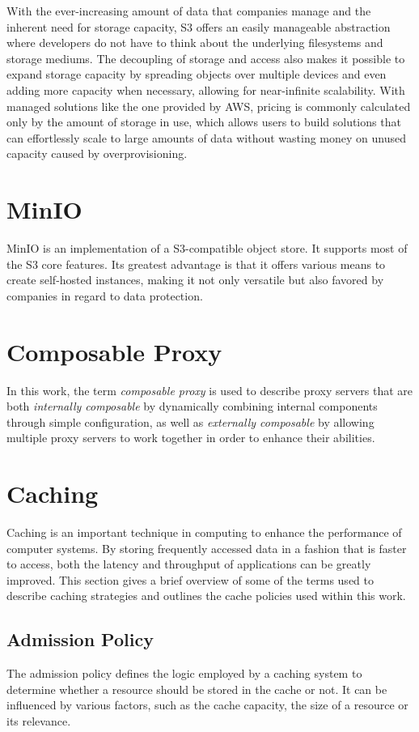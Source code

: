 With the ever-increasing amount of data that companies manage and the inherent need for storage capacity, S3 offers an easily manageable abstraction where developers do not have to think about the underlying filesystems and storage mediums. The decoupling of storage and access also makes it possible to expand storage capacity by spreading objects over multiple devices and even adding more capacity when necessary, allowing for near-infinite scalability. With managed solutions like the one provided by AWS, pricing is commonly calculated only by the amount of storage in use, which allows users to build solutions that can effortlessly scale to large amounts of data without wasting money on unused capacity caused by overprovisioning.

\section{MinIO}
MinIO is an implementation of a S3-compatible object store. It supports most of the S3 core features. Its greatest advantage is that it offers various means to create self-hosted instances, making it not only versatile but also favored by companies in regard to data protection.

\section{Composable Proxy}
\label{composition}
In this work, the term \textit{composable proxy} is used to describe proxy servers that are both \textit{internally composable} by dynamically combining internal components through simple configuration, as well as \textit{externally composable} by allowing multiple proxy servers to work together in order to enhance their abilities.

\section{Caching}

Caching is an important technique in computing to enhance the performance of computer systems. By storing frequently accessed data in a fashion that is faster to access, both the latency and throughput of applications can be greatly improved.
This section gives a brief overview of some of the terms used to describe caching strategies and outlines the cache policies used within this work.

\subsection{Admission Policy}
The admission policy defines the logic employed by a caching system to determine whether a resource should be stored in the cache or not. It can be influenced by various factors, such as the cache capacity, the size of a resource or its relevance.

